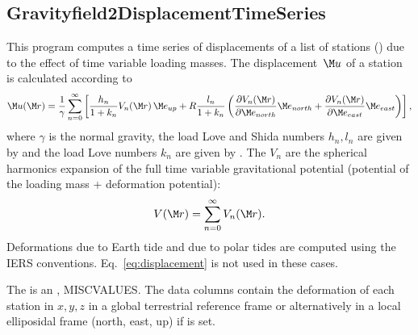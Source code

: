 \subsection{Gravityfield2DisplacementTimeSeries}\label{Gravityfield2DisplacementTimeSeries}
This program computes a time series of displacements of a list of stations ()
due to the effect of time variable loading masses. The displacement~$\M u$ of a station is calculated according to
\begin{equation}\label{eq:displacement}
\M u(\M r) = \frac{1}{\gamma}\sum_{n=0}^\infty \left[\frac{h_n}{1+k_n}V_n(\M r)\,\M e_{up}
+ R\frac{l_n}{1+k_n}\left(
 \frac{\partial V_n(\M r)}{\partial \M e_{north}}\M e_{north}
+\frac{\partial V_n(\M r)}{\partial \M e_{east}} \M e_{east}\right)\right],
\end{equation}
where $\gamma$ is the normal gravity, the load Love and Shida numbers $h_n,l_n$ are given by
 and the load Love numbers $k_n$ are given by
. The $V_n$ are the spherical harmonics expansion of
the full time variable gravitational potential (potential of the loading mass + deformation potential):
\begin{equation}
V(\M r) = \sum_{n=0}^\infty V_n(\M r).
\end{equation}
Deformations due to Earth tide and due to polar tides are computed using the IERS conventions.
Eq.~\eqref{eq:displacement} is not used in these cases.

The  is an , MISCVALUES.
The data columns contain the deformation of each station in $x,y,z$ in a global terrestrial
reference frame or alternatively in a local elliposidal frame (north, east, up)
if  is set.


